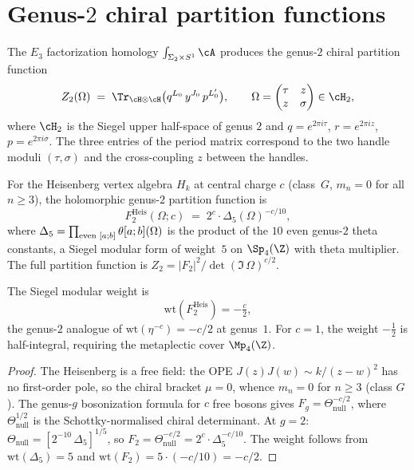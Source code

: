\section{Genus-\texorpdfstring{$2$}{2} chiral partition functions}
\label{sec:genus-2-partition}

The $E_3$ factorization homology $\int_{\Sigma_2 \times S^1} \cA$ produces
the genus-$2$ chiral partition function
\[
 Z_2(\Omega) \;=\; \Tr_{\cH \otimes \cH}\bigl(q^{L_0}\, y^{J_0}\, p^{L_0'}\bigr),
 \qquad \Omega = \begin{pmatrix} \tau & z \\ z & \sigma \end{pmatrix} \in \cH_2,
\]
where $\cH_2$ is the Siegel upper half-space of genus $2$ and
$q = e^{2\pi i\tau}$, $r = e^{2\pi i z}$, $p = e^{2\pi i\sigma}$.
The three entries of the period matrix correspond to the two handle
moduli $(\tau, \sigma)$ and the cross-coupling $z$ between the handles.

\begin{proposition}
\label{prop:genus2-heisenberg}
For the Heisenberg vertex algebra $H_k$ at central charge $c$
\textup{(}class~$G$, $m_n = 0$ for all $n \geq 3$\textup{)}, the
holomorphic genus-$2$ partition function is
\[
 F_2^{\mathrm{Heis}}(\Omega; c)
 \;=\;
 2^c \cdot \Delta_5(\Omega)^{-c/10},
\]
where $\Delta_5 = \prod_{\textup{even } [a;b]} \theta[a;b](\Omega)$ is
the product of the $10$ even genus-$2$ theta constants, a Siegel
modular form of weight~$5$ on $\Sp_4(\Z)$ with theta multiplier.
The full partition function is
$Z_2 = |F_2|^2 / \det(\Im\,\Omega)^{c/2}$.

The Siegel modular weight is
\[
 \mathrm{wt}(F_2^{\mathrm{Heis}}) = -\tfrac{c}{2},
\]
the genus-$2$ analogue of $\mathrm{wt}(\eta^{-c}) = -c/2$ at genus~$1$.
For $c = 1$, the weight $-\frac{1}{2}$ is half-integral, requiring the
metaplectic cover $\Mp_4(\Z)$.
\end{proposition}

\begin{proof}
The Heisenberg is a free field: the OPE $J(z)J(w) \sim k/(z-w)^2$ has
no first-order pole, so the chiral bracket $\mu = 0$, whence $m_n = 0$
for $n \geq 3$ (class $G$). The genus-$g$ bosonization formula for $c$
free bosons gives $F_g = \Theta_{\mathrm{null}}^{-c/2}$, where
$\Theta_{\mathrm{null}}^{1/2}$ is the Schottky-normalised chiral
determinant. At $g = 2$: $\Theta_{\mathrm{null}} = [2^{-10}\,\Delta_5]^{1/5}$,
so $F_2 = \Theta_{\mathrm{null}}^{-c/2} = 2^c \cdot \Delta_5^{-c/10}$.
The weight follows from $\mathrm{wt}(\Delta_5) = 5$ and
$\mathrm{wt}(F_2) = 5 \cdot (-c/10) = -c/2$.
\end{proof}

